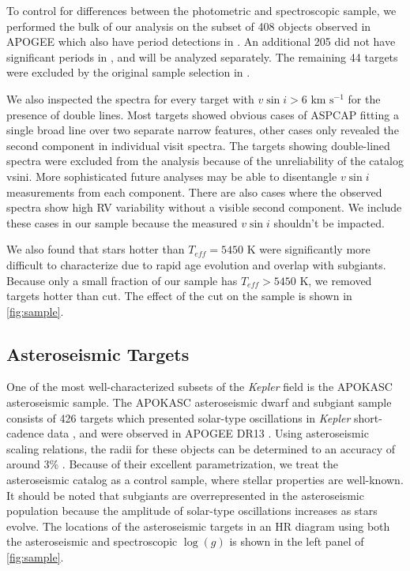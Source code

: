 \documentclass[manuscript]{aastex6}
\newcommand{\vsini}{\ensuremath{v \sin i}}
\newcommand{\Kepler}{\mbox{\textit{Kepler}}}
\newcommand{\Teff}{\ensuremath{T_{eff}}}
\newcommand{\logg}{\ensuremath{\log(g)}}
\newcommand{\kms}{\textrm{~km~s}\ensuremath{^{-1}}}
\begin{document}
To control for differences between the photometric and spectroscopic sample,
we performed the bulk of our analysis on the subset of 408 objects
observed in APOGEE which also have period detections in \citet{McQuillan14}.
An additional 205 did not have significant periods in \citet{McQuillan14}, and
will be analyzed separately. The remaining 44 targets were excluded by
the original sample selection in \citet{McQuillan14}. 

We also inspected the spectra for every target with \(\vsini > 6 \kms\)
for the presence of double lines. Most targets showed obvious cases of ASPCAP 
fitting a single broad line over two separate narrow features, other cases 
only revealed the second component in individual visit spectra. The targets 
showing double-lined spectra were excluded from the analysis because of
the unreliability of the catalog vsini. More sophisticated future
analyses \citet{ElBadry18} may be able to disentangle \vsini{}
measurements from each component. There are
also cases where the observed spectra show high RV variability
without a visible second component. We include these cases in our sample
because the measured \vsini{} shouldn't be impacted.


We also found that stars hotter than
\(\Teff = 5450\) K were significantly more difficult to characterize due to
rapid age evolution and overlap with subgiants. Because only a small 
fraction of our sample has \(\Teff > 5450\) K, we removed targets hotter
than cut. The effect of the cut on the sample is shown in \cref{fig:sample}.

\subsection{Asteroseismic Targets}

One of the most well-characterized subsets of the \Kepler{} field is the
APOKASC asteroseismic sample. The APOKASC asteroseismic dwarf and subgiant 
sample consists of 426 targets which presented solar-type oscillations in 
\Kepler{} short-cadence data \citep{Chaplin11}, and were observed in APOGEE DR13
\citep{Majewski17}. Using asteroseismic scaling relations, the radii
for these objects can be determined to an accuracy of around 3\%
\citep{Serenelli17}. Because of their excellent parametrization, we treat the
asteroseismic catalog as a control sample, where stellar properties are
well-known. It should be noted that subgiants are overrepresented in
the asteroseismic population because the amplitude of solar-type oscillations 
increases as stars evolve. The locations of the asteroseismic targets in an HR
diagram using both the asteroseismic and spectroscopic \logg{} is shown in 
the left panel of \cref{fig:sample}.
\end{document}
